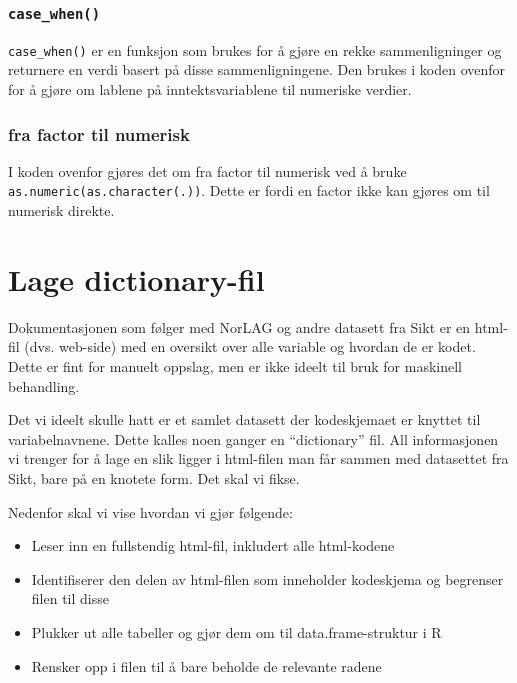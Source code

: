 \documentclass[
  norsk,
  letterpaper,
  DIV=11,
  numbers=noendperiod]{scrreprt}
\providecommand{\tightlist}{%
  \setlength{\itemsep}{0pt}\setlength{\parskip}{0pt}}
\theoremstyle{definition}
\theoremstyle{remark}
\begin{document}
\subsection{\texorpdfstring{\texttt{case\_when()}}{case\_when()}}\label{case_when}

\texttt{case\_when()} er en funksjon som brukes for å gjøre en rekke
sammenligninger og returnere en verdi basert på disse sammenligningene.
Den brukes i koden ovenfor for å gjøre om lablene på inntektsvariablene
til numeriske verdier.

\subsection{fra factor til numerisk}\label{fra-factor-til-numerisk}

I koden ovenfor gjøres det om fra factor til numerisk ved å bruke
\texttt{as.numeric(as.character(.))}. Dette er fordi en factor ikke kan
gjøres om til numerisk direkte.

\chapter{Lage dictionary-fil}\label{lage-dictionary-fil}

Dokumentasjonen som følger med NorLAG og andre datasett fra Sikt er en
html-fil (dvs. web-side) med en oversikt over alle variable og hvordan
de er kodet. Dette er fint for manuelt oppslag, men er ikke ideelt til
bruk for maskinell behandling.

Det vi ideelt skulle hatt er et samlet datasett der kodeskjemaet er
knyttet til variabelnavnene. Dette kalles noen ganger en ``dictionary''
fil. All informasjonen vi trenger for å lage en slik ligger i html-filen
man får sammen med datasettet fra Sikt, bare på en knotete form. Det
skal vi fikse.

Nedenfor skal vi vise hvordan vi gjør følgende:

\begin{itemize}
\tightlist
\item
  Leser inn en fullstendig html-fil, inkludert alle html-kodene
\item
  Identifiserer den delen av html-filen som inneholder kodeskjema og
  begrenser filen til disse
\item
  Plukker ut alle tabeller og gjør dem om til data.frame-struktur i R
\item
  Rensker opp i filen til å bare beholde de relevante radene
\end{itemize}
\end{document}
